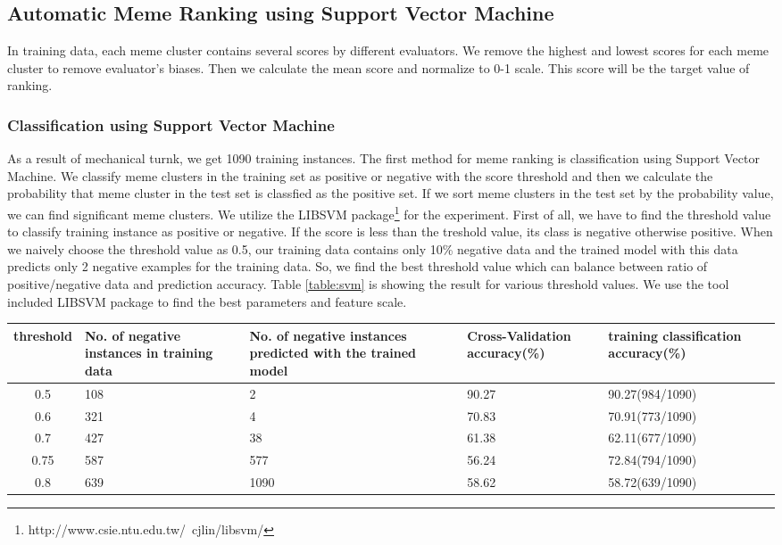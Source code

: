\documentclass{sig-alternate}
\begin{document}
\subsection{Automatic Meme Ranking using Support Vector Machine}
In training data, each meme cluster contains several scores by different evaluators. We remove the highest and lowest scores for each meme cluster to remove evaluator's biases. Then we calculate the mean score and normalize to 0-1 scale. This score will be the target value of ranking.

\subsubsection{Classification using Support Vector Machine}
As a result of mechanical turnk, we get 1090 training instances. The first method for meme ranking is classification using Support Vector Machine. We classify meme clusters in the training set as positive or negative with the score threshold and then we calculate the probability that meme cluster in the test set is classfied as the positive set. If we sort meme clusters in the test set by the probability value, we can find significant meme clusters. We utilize the LIBSVM package\footnote{http://www.csie.ntu.edu.tw/~cjlin/libsvm/} for the experiment.
First of all, we have to find the threshold value to classify training instance as positive or negative. If the score is less than the treshold value, its class is negative otherwise positive. When we naively choose the threshold value as 0.5, our training data contains only 10\% negative data and the trained model with this data predicts only 2 negative examples for the training data. So, we find the best threshold value which can balance between ratio of positive/negative data and prediction accuracy. Table \ref{table:svm} is showing the result for various threshold values. We use the tool included LIBSVM package to find the best parameters and feature scale.

\begin{table*}[h!b!p!]
\begin{center}
\begin{tabular}{|c|p{3.0cm}|p{3.0cm}|p{3.0cm}|p{3.0cm}|p{3.0cm}|}
\hline
threshold&No. of negative instances in training data&No. of negative instances predicted with the trained model&Cross-Validation accuracy(\%)&training classification accuracy(\%)\\
\hline
0.5&108&2&90.27&90.27(984/1090)\\
0.6&321&4&70.83&70.91(773/1090)\\
0.7&427&38&61.38&62.11(677/1090)\\
0.75&587&577&56.24&72.84(794/1090)\\
0.8&639&1090&58.62&58.72(639/1090)\\
\hline
\end{tabular}
\caption{Classification experiment using SVM}
\label{table:svm}
\end{center}
\end{table*}
\end{document}
